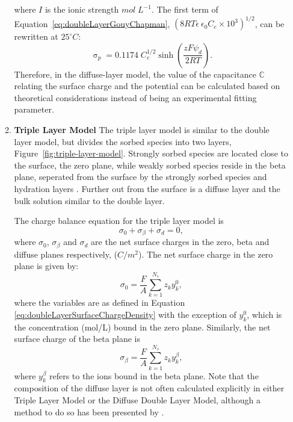 \begin{enumerate}
\begin{enumerate}
\begin{equation}
\end{equation} 
where $I$ is the ionic strength $mol\;L^{-1}$. The first term of Equation~\eqref{eq:doubleLayerGouyChapman}, $(8RT\epsilon \ \epsilon _{0} C_e \times 10^{3} )^{1/2}$, can be rewritten at $25^{\circ}C$:
%
\begin{equation} \label{eq:doubleLayerGouyChapman25} 
  \mathop{\sigma }\nolimits_{p} = 0.1174\;C_e^{1/2} \sinh \left( \frac{zF \psi_d}{2RT} \right) .
\end{equation} 
Therefore, in the diffuse-layer model, the value of the capacitance $\mathbb{C}$ relating the surface charge and the potential can be calculated based on theoretical considerations instead of being an experimental fitting parameter.

\item \textbf{Triple Layer Model} 
The triple layer model is similar to the double layer model, but
divides the sorbed species into two layers,
Figure~\ref{fig:triple-layer-model}. Strongly sorbed species are
located close to the surface, the zero plane, while weakly sorbed
species reside in the beta plane, seperated from the surface by the
strongly sorbed species and hydration layers \citep[e.g.][]{langmuir-1997}. Further out from the surface is a diffuse layer and the bulk solution similar to the double
layer.

The charge balance equation for the triple layer model is
\begin{equation}
  \sigma_0 + \sigma_{\beta} + \sigma_d = 0,
\end{equation}
\noindent where $\sigma_0$, $\sigma_{\beta}$ and $\sigma_d$ are the
net surface charges in the zero, beta and diffuse planes respectively, ($C/m^2$).
The net surface charge in the zero plane is given by:
\begin{equation}    \label{eq:ChargeDensityZeroPlane}
  \sigma_0 =  \frac{F}{A} \sum _{k=1}^{N_{s} } z_{k} y^{0}_{k}  ,
\end{equation}
where the variables are as defined in Equation \eqref{eq:doubleLayerSurfaceChargeDensity} with the exception of $y^{0}_{k}$, which is the concentration (mol/L) bound in the zero plane. Similarly, the net surface charge of the beta plane is
\begin{equation}    \label{eq:ChargeDensityBetaPlane}
  \sigma_{\beta} =  \frac{F}{A} \sum _{k=1}^{N_{s} } z_{k} y^{\beta}_{k}  ,
\end{equation}
where $y^{\beta}_{k}$ refers to the ions bound in the beta plane.
Note that the composition of the diffuse layer is not often calculated explicitly in either Triple Layer Model or the Diffuse Double Layer Model, although a method to do so has been presented by \citet{leroy2007modeling}.


\end{enumerate}
\end{enumerate}
